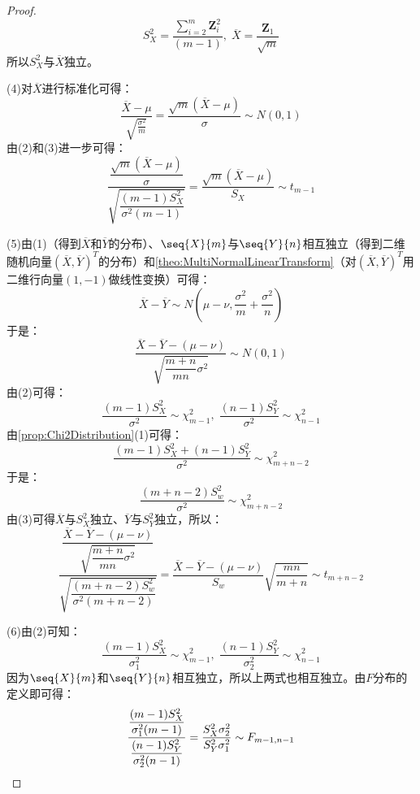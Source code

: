 \begin{proof}
	\begin{equation*}
		S_X^2=\frac{\sum\limits_{i=2}^{m}\mathbf{Z}_i^2}{(m-1)},\;\overline{X}=\frac{\mathbf{Z}_1}{\sqrt{m}}
	\end{equation*}
	所以$S_X^2$与$\overline{X}$独立。\par
	(4)对$\overline{X}$进行标准化可得：
	\begin{equation*}
		\frac{\overline{X}-\mu}{\sqrt{\frac{\sigma^2}{m}}}=\frac{\sqrt{m}(\overline{X}-\mu)}{\sigma}\sim N(0,1)
	\end{equation*}
	由(2)和(3)进一步可得：
	\begin{equation*}
		\frac{\dfrac{\sqrt{m}(\overline{X}-\mu)}{\sigma}}{\sqrt{\dfrac{(m-1)S_X^2}{\sigma^2(m-1)}}}=\frac{\sqrt{m}(\overline{X}-\mu)}{S_X}\sim t_{m-1}
	\end{equation*}\par
	(5)由(1)（得到$\overline{X}$和$\overline{Y}$的分布）、$\seq{X}{m}$与$\seq{Y}{n}$相互独立（得到二维随机向量$(\overline{X},\overline{Y})^T$的分布）和\cref{theo:MultiNormalLinearTransform}（对$(\overline{X},\overline{Y})^T$用二维行向量$(1,-1)$做线性变换）可得：
	\begin{equation*}
		\overline{X}-\overline{Y}\sim N\left(\mu-\nu,\frac{\sigma^2}{m}+\frac{\sigma^2}{n}\right)
	\end{equation*}
	于是：
	\begin{equation*}
		\frac{\overline{X}-\overline{Y}-(\mu-\nu)}{\sqrt{\dfrac{m+n}{mn}\sigma^2}}\sim N(0,1)
	\end{equation*}
	由(2)可得：
	\begin{equation*}
		\frac{(m-1)S_X^2}{\sigma^2}\sim\chi_{m-1}^2,\;
		\frac{(n-1)S_Y^2}{\sigma^2}\sim\chi_{n-1}^2
	\end{equation*}
	由\cref{prop:Chi2Distribution}(1)可得：
	\begin{equation*}
		\frac{(m-1)S_X^2+(n-1)S_Y^2}{\sigma^2}\sim\chi_{m+n-2}^2
	\end{equation*}
	于是：
	\begin{equation*}
		\frac{(m+n-2)S_w^2}{\sigma^2}\sim\chi_{m+n-2}^2
	\end{equation*}
	由(3)可得$\overline{X}$与$S_X^2$独立、$\overline{Y}$与$S_Y^2$独立，所以：
	\begin{equation*}
		\frac{\dfrac{\overline{X}-\overline{Y}-(\mu-\nu)}{\sqrt{\dfrac{m+n}{mn}\sigma^2}}}{\sqrt{\dfrac{(m+n-2)S_w^2}{\sigma^2(m+n-2)}}}=\frac{\overline{X}-\overline{Y}-(\mu-\nu)}{S_w}\sqrt{\dfrac{mn}{m+n}}\sim t_{m+n-2}
	\end{equation*}\par
	(6)由(2)可知：
	\begin{equation*}
		\frac{(m-1)S_X^2}{\sigma_1^2}\sim\chi_{m-1}^2,\;
		\frac{(n-1)S_Y^2}{\sigma_2^2}\sim\chi_{n-1}^2
	\end{equation*}
	因为$\seq{X}{m}$和$\seq{Y}{n}$相互独立，所以上两式也相互独立。由$F$分布的定义即可得：
	\begin{equation*}
		\frac{\dfrac{(m-1)S_X^2}{\sigma_1^2(m-1)}}{\dfrac{(n-1)S_Y^2}{\sigma_2^2(n-1)}}=\frac{S_X^2\sigma_2^2}{S_Y^2\sigma_1^2}\sim F_{m-1,n-1}\qedhere
	\end{equation*}
\end{proof}

